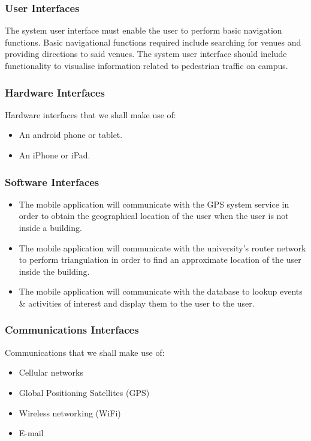 \documentclass[english]{article}
\begin{document}
				\subsubsection{User Interfaces}
						The system user interface must enable the user to perform basic navigation functions. Basic navigational functions required include searching for venues and providing directions to said venues. The system user interface should include functionality to visualise information related to pedestrian traffic on campus.

				\subsubsection{Hardware Interfaces}
				    Hardware interfaces that we shall make use of:
						\begin{itemize}
						    \item An android phone or tablet.
						    \item An iPhone or iPad.
						\end{itemize}

				\subsubsection{Software Interfaces}
				\begin{itemize}
					\item The mobile application will communicate with the GPS system service in order to obtain the geographical location of the user when the user is not inside a building.
					\item The mobile application will communicate with the university's router network to perform triangulation in order to find an approximate location of the user inside the building.
					\item The mobile application will communicate with the database to lookup events \& activities of interest and display them to the user to the user.
				\end{itemize}
						

				\subsubsection{Communications Interfaces}
				    Communications that we shall make use of:
					\begin{itemize}
					    \item Cellular networks
					    \item Global Positioning Satellites (GPS)
					    \item Wireless networking (WiFi)
					    \item E-mail
					\end{itemize}
\end{document}
